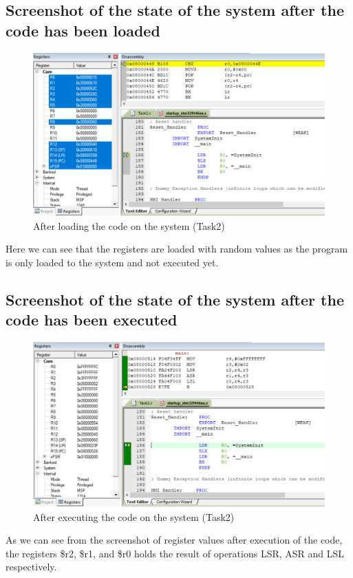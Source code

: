 \documentclass[footheight=20pt, footsepline, headheight=20pt, headsepline]{scrartcl}
\begin{document}
\FloatBarrier
\subsection*{Screenshot of the state of the system after the code has been loaded}
\begin{figure}[ht]
    \centering
    \includegraphics[scale=.7]{images/Task2Before1.jpg}
    \caption{After loading the code on the system (Task2)}
    \label{fig:before_task_two}
\end{figure}
\FloatBarrier
Here we can see that the registers are loaded with random values as the program is only loaded to the system and not executed yet.
\subsection*{Screenshot of the state of the system after the code has been executed}
\begin{figure}[h!]
    \centering
    \includegraphics[scale=.7]{images/Task2After1.jpg}
    \caption{After executing the code on the system (Task2)}
    \label{fig:after_task_two}
\end{figure}
\FloatBarrier
As we can see from the screenshot of register values after execution of the code, the registers \$r2, \$r1, and \$r0 holds the result of operations LSR, ASR and LSL respectively.
\end{document}
